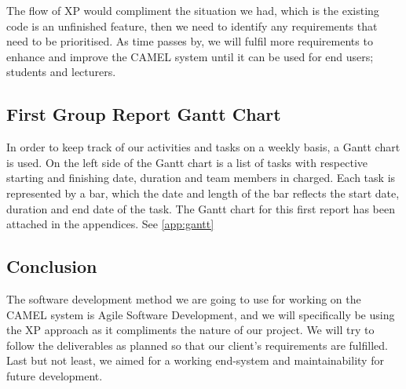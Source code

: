 		The flow of XP would compliment the situation we had, which is the existing code is an unfinished feature, then we need to identify any requirements that need to be prioritised. As time passes by, we will fulfil more requirements to enhance and improve the CAMEL system until it can be used for end users; students and lecturers.
\newpage	
	\subsection*{First Group Report Gantt Chart}
		In order to keep track of our activities and tasks on a weekly basis, a Gantt chart is used. On the left side of the Gantt chart is a list of tasks with respective starting and finishing date, duration and team members in charged. Each task is represented by a bar, which the date and length of the bar reflects the start date, duration and end date of the task. The Gantt chart for this first report has been attached in the appendices. See \ref{app:gantt}  
	
	\subsection*{Conclusion}
		The software development method we are going to use for working on the CAMEL system is Agile Software Development, and we will specifically be using the XP approach as it compliments the nature of our project. We will try to follow the deliverables as planned so that our client’s requirements are fulfilled. Last but not least, we aimed for a working end-system and maintainability for future development.

	

